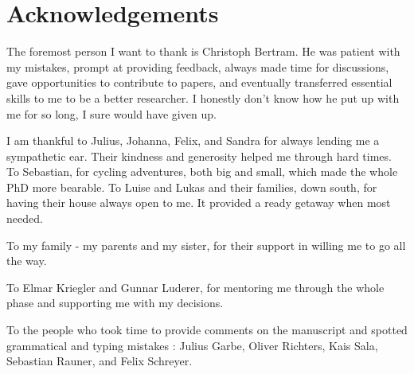 \chapter*{Acknowledgements}
The foremost person I want to thank is Christoph Bertram. He was patient with my mistakes, prompt at providing feedback, always made time for discussions, gave opportunities to contribute to papers, and eventually transferred essential skills to me to be a better researcher. I honestly don't know how he put up with me for so long, I sure would have given up.

I am thankful to Julius, Johanna, Felix, and Sandra for always lending me a sympathetic ear. Their kindness and generosity helped me through hard times. To Sebastian, for cycling adventures, both big and small, which made the whole PhD more bearable. To Luise and Lukas and their families, down south, for having their house always open to me. It provided a ready getaway when most needed. 

To my family - my parents and my sister, for their support in willing me to go all the way.

To Elmar Kriegler and Gunnar Luderer, for mentoring me through the whole phase and supporting me with my decisions. 

To the people who took time to provide comments on the manuscript and spotted grammatical and typing mistakes : Julius Garbe, Oliver Richters, Kais Sala, Sebastian Rauner, and Felix Schreyer.   



